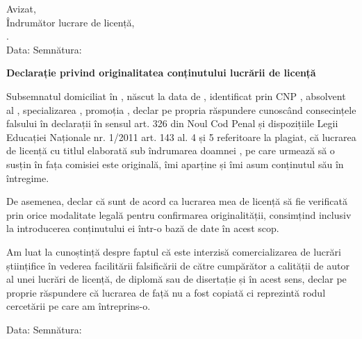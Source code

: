 \vspace*{\fill}

\begin{flushright}
    Avizat, \\
    Îndrumător lucrare de licență, \\
    \coordinator. \\
    Data: \dottedline \hspace{1cm} Semnătura: \dottedline
\end{flushright}

\vspace{1cm}
\begin{center}
    \large
    \textbf{Declarație privind originalitatea conținutului lucrării de licență}
\end{center}

Subsemnatul \textbf{\authornamelf} domiciliat în \textbf{\authoraddress}, născut la data de \textbf{\authorbirth}, identificat prin CNP \textbf{\authorcnp}, absolvent al \facultyg, \textbf{\faculty} specializarea \textbf{\speciality}, promoția \promotion, declar pe propria răspundere cunoscând consecințele falsului în declarații în sensul art. 326 din Noul Cod Penal și dispozițiile Legii Educației Naționale nr. 1/2011 art. 143 al. 4 și 5 referitoare la plagiat, că lucrarea de licență cu titlul \textbf{\thesistitle} elaborată sub îndrumarea doamnei \textbf{\coordinator}, pe care urmează să o susțin în fața comisiei este originală, îmi aparține și îmi asum conținutul său în întregime.

De asemenea, declar că sunt de acord ca lucrarea mea de licență să fie verificată prin orice modalitate legală pentru confirmarea originalității, consimțind inclusiv la introducerea conținutului ei într-o bază de date în acest scop.

Am luat la cunoștință despre faptul că este interzisă comercializarea de lucrări științifice în vederea facilitării falsificării de către cumpărător a calității de autor al unei lucrări de licență, de diplomă sau de disertație și în acest sens, declar pe proprie răspundere că lucrarea de față nu a fost copiată ci reprezintă rodul cercetării pe care am întreprins-o.

\begin{flushright}
    Data: \dottedline \hspace{6cm} Semnătura: \dottedline
\end{flushright}

\vspace*{\fill}
\pagebreak